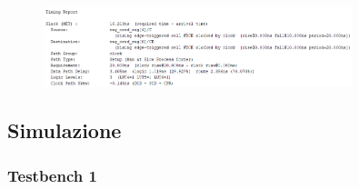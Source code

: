 \documentclass{article}
\begin{document}
\begin{figure}[h]
    \centering
    \includegraphics[width=0.8\textwidth]{report slack-time.png} %
    \label{fig:Report timing: Slack Time}
\end{figure}


\subsection{Simulazione}

\subsubsection{Testbench 1}
\end{document}
